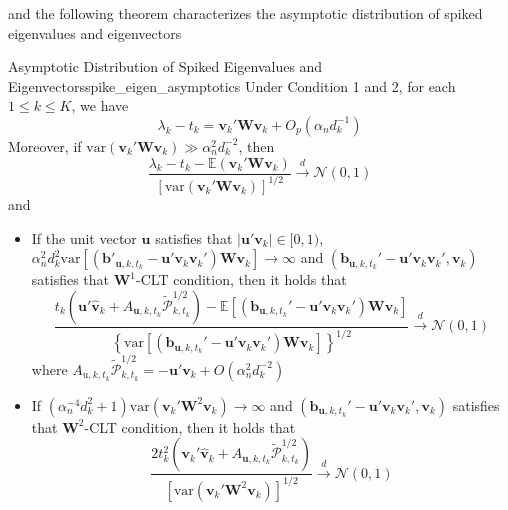 \documentclass[twoside]{article}
\begin{document}
and the following theorem characterizes the asymptotic distribution of spiked eigenvalues and eigenvectors
\begin{theorem}{Asymptotic Distribution of Spiked Eigenvalues and Eigenvectors}{spike_eigen_asymptotics}
    Under Condition 1 and 2, for each $1\leq k \leq K$, we have 
    $$
    \lambda_k - t_k = \mathbf{v}_k'\mathbf{W}\mathbf{v}_k + O_p(\alpha_n d^{-1}_k)
    $$
    Moreover, if $\mathrm{var}\left(\mathbf{v}_k'\mathbf{W}\mathbf{v}_k\right) \gg \alpha^2_n d_k^{-2}$, then 
    $$
    \frac{\lambda_k -t_k - \mathbb{E}\left(\mathbf{v}_k' \mathbf{W} \mathbf{v}_k\right)}{\left[ \mathrm{var}\left(\mathbf{v}_k'\mathbf{W} \mathbf{v}_k\right) \right]^{1/2}} \xrightarrow{d} \mathcal{N}(0,1)
    $$
    and 
    \begin{itemize}
        \item If the unit vector $\mathbf{u}$ satisfies that $\left\vert \mathbf{u}'\mathbf{v}_k \right\vert \in [0,1)$, $\alpha^2_n d^2_k \mathrm{var}\left[ \left(\mathbf{b}'_{\mathbf{u},k,t_k} - \mathbf{u}'\mathbf{v}_k\mathbf{v}_k'\right)\mathbf{W}\mathbf{v}_k \right] \rightarrow \infty$ and 
        $\left( \mathbf{b}_{\mathbf{u},k,t_k}' - \mathbf{u}' \mathbf{v}_k\mathbf{v}_k',\mathbf{v}_k \right)$ satisfies that $\mathbf{W}^1$-CLT condition, then it holds that 
        \begin{equation*}
            \frac{t_k\left( \mathbf{u}'\hat{\mathbf{v}}_k + A_{\mathbf{u},k,t_k}\tilde{\mathcal{P}}^{1/2}_{k,t_k} \right) - \mathbb{E}\left[ \left( \mathbf{b}_{\mathbf{u},k,t_k}' - \mathbf{u}' \mathbf{v}_k\mathbf{v}_k' \right) \mathbf{Wv}_k \right] }{ \left\{ \mathrm{var} \left[ \left( \mathbf{b}_{\mathbf{u},k,t_k}' - \mathbf{u}' \mathbf{v}_k\mathbf{v}_k' \right) \mathbf{Wv}_k \right] \right\}^{1/2}} \xrightarrow{d}\mathcal{N}(0,1)
        \end{equation*}
        where $A_{\mathrm{u},k,t_k}\tilde{\mathcal{P}}^{1/2}_{k,t_k} = - \mathbf{u'v}_k + O(\alpha^2_nd_k^{-2})$
        \item If $\left( \alpha_n^{-4} d^2_k + 1 \right)\mathrm{var}\left( \mathbf{v}_k' \mathbf{W}^2 \mathbf{v}_k \right) \rightarrow \infty$ and $\left( \mathbf{b}_{\mathbf{u},k,t_k}' - \mathbf{u}' \mathbf{v}_k\mathbf{v}_k',\mathbf{v}_k \right)$ satisfies that $\mathbf{W}^2$-CLT condition, then it holds that 
        \begin{equation*}
            \frac{2t_k^2 \left( \mathbf{v}_k'\hat{\mathbf{v}}_k + A_{\mathbf{u},k,t_k} \tilde{\mathcal{P}}^{1/2}_{k,t_k} \right)}{ \left[ \mathrm{var}\left( \mathbf{v}_k' \mathbf{W}^2 \mathbf{v}_k \right) \right]^{1/2} } \xrightarrow{d} \mathcal{N}(0,1)

\end{equation*}
\end{itemize}
\end{theorem}
\end{document}
